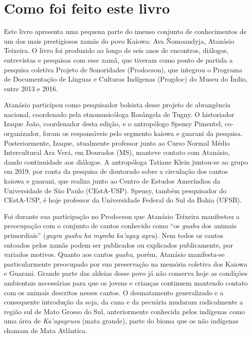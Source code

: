\chapter{Como foi feito este livro}

Este livro apresenta uma pequena parte do imenso conjunto de
conhecimentos de um dos mais prestigiosos xamãs do povo Kaiowa: Ava
Ñomoandyja, Atanásio Teixeira. O livro foi produzido ao longo de seis
anos de encontros, diálogos, entrevistas e pesquisas com esse xamã, que
tiveram como ponto de partida a pesquisa coletiva Projeto de Sonoridades
(Prodocson), que integrou o Programa de Documentação de Línguas e
Culturas Indígenas (Progdoc) do Museu do Índio, entre 2013 e 2016.

Atanásio participou como pesquisador bolsista desse projeto de
abrangência nacional, coordenado pela etnomusicóloga Rosângela de Tugny.
O historiador Izaque João, coordenador desta edição, e o antropólogo
Spensy Pimentel, co-organizador, foram os responsáveis pelo segmento
kaiowa e guarani da pesquisa. Posteriormente, Izaque, atualmente
professor junto ao Curso Normal Médio Intercultural Ara Verá, em
Dourados (MS), manteve contato com Atanásio, dando continuidade aos
diálogos. A antropóloga Tatiane Klein juntou-se ao grupo em 2019, por
conta da pesquisa de doutorado sobre a circulação dos cantos kaiowa e
guarani, que realiza junto ao Centro de Estudos Ameríndios da
Universidade de São Paulo (CEstA-USP). Spensy, também pesquisador do
CEstA-USP, é hoje professor da Universidade Federal do Sul da Bahia
(UFSB).

Foi durante sua participação no Prodocson que Atanásio Teixeira
manifestou a preocupação com o conjunto de cantos conhecido como ``os
\emph{guahu} dos animais primordiais'' (\emph{guyra guahu} \emph{ha
mymba ka'aguy ayvu}). Nem todos os cantos entoados pelos xamãs podem ser
publicados ou explicados publicamente, por variados motivos. Quanto aos
cantos \emph{guahu}, porém, Atanásio manifesta-se particularmente
preocupado por sua preservação na memória coletiva dos Kaiowa e Guarani.
Grande parte das aldeias desse povo já não conserva hoje as condições
ambientais necessárias para que os jovens e crianças continuem mantendo
contato com os animais descritos nesses cantos. O desmatamento
generalizado e a consequente introdução da soja, da cana e da pecuária
mudaram radicalmente a região sul de Mato Grosso do Sul, anteriormente
conhecida pelos indígenas como uma área de \emph{Ka'aguyrusu} (mata
grande), parte do bioma que os não indígenas chamam de Mata Atlântica.

